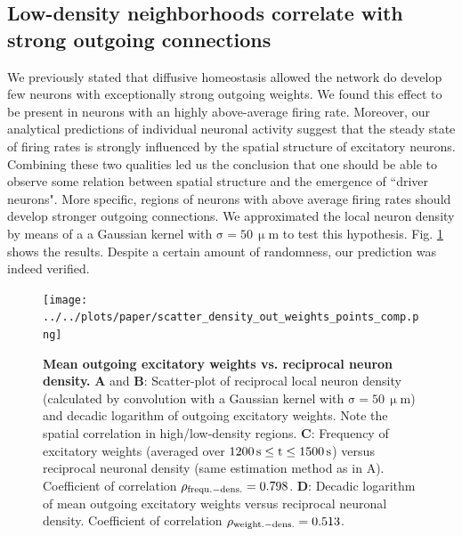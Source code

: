 \documentclass[10pt,letterpaper]{article}
\begin{document}
\subsection*{Low-density neighborhoods correlate with strong outgoing connections}
We previously stated that diffusive homeostasis allowed the network do develop few neurons with exceptionally strong outgoing weights. We found this effect to be present in neurons with an highly above-average firing rate. Moreover, our analytical predictions of individual neuronal activity suggest that the steady state of firing rates is strongly influenced by the spatial structure of excitatory neurons. Combining these two qualities led us the conclusion that one should be able to observe some relation between spatial structure and the emergence of ``driver neurons". More specific, regions of neurons with above average firing rates should develop stronger outgoing connections. We approximated the local neuron density by means of a a Gaussian kernel with $\mathrm{\sigma = 50\, \upmu m}$ to test this hypothesis. Fig. \ref{Inverse_Dens_vs_Sum_Out_Weights} shows the results. Despite a certain amount of randomness, our prediction was indeed verified. 
\begin{figure}
\texttt{[image: ../../plots/paper/scatter\_density\_out\_weights\_points\_comp.png]}
\caption{{\bf Mean outgoing excitatory weights vs. reciprocal neuron density.} \textbf{A} and \textbf{B}: Scatter-plot of reciprocal local neuron density (calculated by convolution with a Gaussian kernel with $\mathrm{\sigma = 50\, \upmu m}$) and decadic logarithm of outgoing excitatory weights. Note the spatial correlation in high/low-density regions. \textbf{C}: Frequency of excitatory weights (averaged over $\rm 1200\,s \leq t \leq 1500\,s$) versus reciprocal neuronal density (same estimation method as in A). Coefficient of correlation $\rho_{\rm frequ.-dens.} = 0.798$. \textbf{D}: Decadic logarithm of mean outgoing excitatory weights versus reciprocal neuronal density. Coefficient of correlation $\rho_{\rm weight.-dens.} = 0.513$.}
\label{Inverse_Dens_vs_Sum_Out_Weights}
\end{figure}
\end{document}
